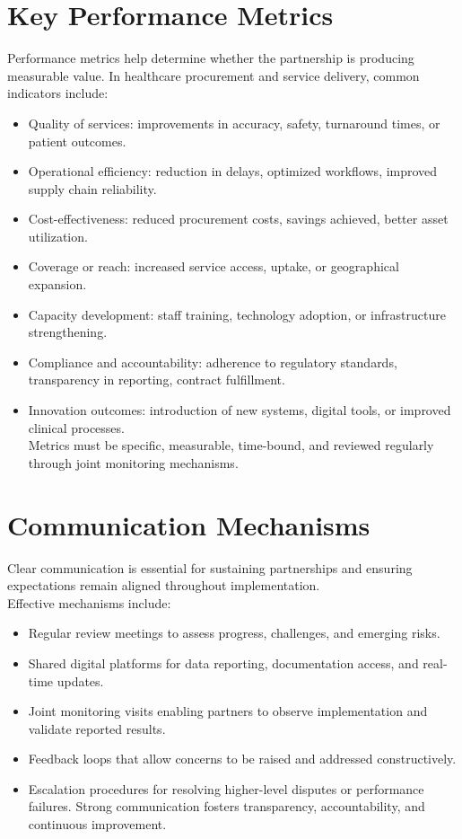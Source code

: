 \documentclass[10pt]{article}
\begin{document}
\section*{Key Performance Metrics}
Performance metrics help determine whether the partnership is producing measurable value. In healthcare procurement and service delivery, common indicators include:

\begin{itemize}
  \item Quality of services: improvements in accuracy, safety, turnaround times, or patient outcomes.
  \item Operational efficiency: reduction in delays, optimized workflows, improved supply chain reliability.
  \item Cost-effectiveness: reduced procurement costs, savings achieved, better asset utilization.
  \item Coverage or reach: increased service access, uptake, or geographical expansion.
  \item Capacity development: staff training, technology adoption, or infrastructure strengthening.
  \item Compliance and accountability: adherence to regulatory standards, transparency in reporting, contract fulfillment.
  \item Innovation outcomes: introduction of new systems, digital tools, or improved clinical processes.\\
Metrics must be specific, measurable, time-bound, and reviewed regularly through joint monitoring mechanisms.
\end{itemize}

\section*{Communication Mechanisms}
Clear communication is essential for sustaining partnerships and ensuring expectations remain aligned throughout implementation.\\
Effective mechanisms include:

\begin{itemize}
  \item Regular review meetings to assess progress, challenges, and emerging risks.
  \item Shared digital platforms for data reporting, documentation access, and real-time updates.
  \item Joint monitoring visits enabling partners to observe implementation and validate reported results.
  \item Feedback loops that allow concerns to be raised and addressed constructively.
  \item Escalation procedures for resolving higher-level disputes or performance failures. Strong communication fosters transparency, accountability, and continuous improvement.
\end{itemize}
\end{document}
